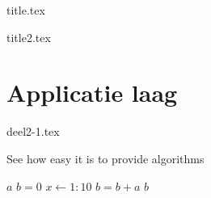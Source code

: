\documentclass[a4paper,11pt]{article}
\begin{document}
{title.tex}

\clearpage

{title2.tex}

\clearpage

\thispagestyle{empty}

\tableofcontents

\clearpage



\setcounter{section}{1}
\section{Applicatie laag}
{deel2-1.tex}


\begin{algorithm}[ht]
\caption{See how easy it is to provide algorithms}
\label{myFirstAlgorithm}
\begin{algorithmic}
\REQUIRE $a$
\STATE $b = 0$
\STATE $x \leftarrow 1:10$
    \STATE $b = b+a$
\ENDFOR
\RETURN $b$
\end{algorithmic}
\end{algorithm}



\listofalgorithms
\clearpage
\listoffigures
\clearpage
\listoftables
\clearpage

\printglossary[title=Termen,toctitle=Lijst van termen]

\printglossary[type=\acronymtype]


\clearpage
\end{document}
